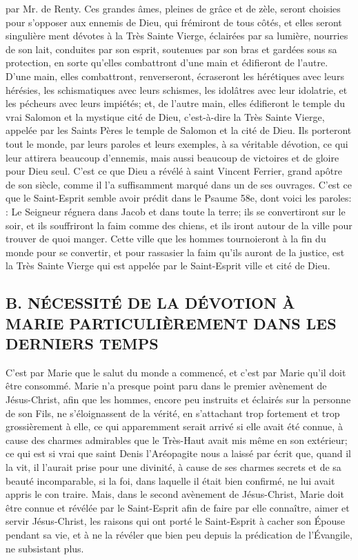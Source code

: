 par Mr. de Renty.
 Ces grandes âmes, pleines de grâce et de zèle, seront choisies pour s'opposer aux ennemis de Dieu, qui
frémiront de tous côtés, et elles seront singulière ment dévotes à la Très Sainte Vierge, éclairées par sa lumière,
nourries de son lait, conduites par son esprit, soutenues par son bras et gardées sous sa protection, en sorte
qu'elles combattront d'une main et édifieront de l'autre. D'une main, elles combattront, renverseront, écraseront les
hérétiques avec leurs hérésies, les schismatiques avec leurs schismes, les idolâtres avec leur idolatrie, et les
pécheurs avec leurs impiétés; et, de l'autre main, elles édifieront le temple du vrai Salomon et la mystique cité de
Dieu, c'est-à-dire la Très Sainte Vierge, appelée par les Saints Pères le temple de Salomon et la cité de Dieu. Ils
porteront tout le monde, par leurs paroles et leurs exemples, à sa véritable dévotion, ce qui leur attirera beaucoup
d'ennemis, mais aussi beaucoup de victoires et de gloire pour Dieu seul. C'est ce que Dieu a révélé à saint Vincent
Ferrier, grand apôtre de son siècle, comme il l'a suffisamment marqué dans un de ses ouvrages.
C'est ce que le Saint-Esprit semble avoir prédit dans le Psaume 58e, dont voici les paroles: : Le Seigneur régnera dans Jacob et dans toute la terre; ils se convertiront sur le soir, et ils souffriront la
faim comme des chiens, et ils iront autour de la ville pour trouver de quoi manger. Cette ville que les hommes
tournoieront à la fin du monde pour se convertir, et pour rassasier la faim qu'ils auront de la justice, est la Très
Sainte Vierge qui est appelée par le Saint-Esprit ville et cité de Dieu.
\subsection{B. NÉCESSITÉ DE LA DÉVOTION À MARIE PARTICULIÈREMENT DANS LES DERNIERS TEMPS}
 C'est par Marie que le salut du monde a commencé, et c'est par Marie qu'il doit être consommé. Marie n'a
presque point paru dans le premier avènement de Jésus-Christ, afin que les hommes, encore peu instruits et
éclairés sur la personne de son Fils, ne s'éloignassent de la vérité, en s'attachant trop fortement et trop
grossièrement à elle, ce qui apparemment serait arrivé si elle avait été connue, à cause des charmes admirables
que le Très-Haut avait mis même en son extérieur; ce qui est si vrai que saint Denis l'Aréopagite nous a laissé par
écrit que, quand il la vit, il l'aurait prise pour une divinité, à cause de ses charmes secrets et de sa beauté
incomparable, si la foi, dans laquelle il était bien confirmé, ne lui avait appris le con traire. Mais, dans le second
avènement de Jésus-Christ, Marie doit être connue et révélée par le Saint-Esprit afin de faire par elle connaître,
aimer et servir Jésus-Christ, les raisons qui ont porté le Saint-Esprit à cacher son Épouse pendant sa vie, et à ne
la révéler que bien peu depuis la prédication de l'Évangile, ne subsistant plus.
